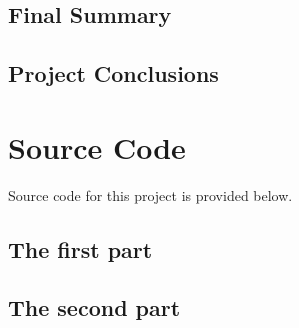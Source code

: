 \documentclass[12pt]{article} %
\begin{document}
\subsection{Final Summary}


\subsection{Project Conclusions}


\pagebreak
\appendix

\section{Source Code}

Source code for this project is provided below.

\subsection{The first part}
% 

\subsection{The second part}
% 
\end{document}

